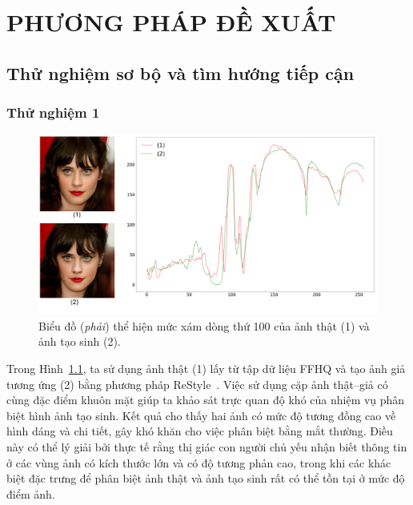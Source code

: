 \chapter{PHƯƠNG PHÁP ĐỀ XUẤT}
\label{Chapter3}
\section{Thử nghiệm sơ bộ và tìm hướng tiếp cận}
%
\subsection{Thử nghiệm 1}
%
\begin{figure}[h!]
	\centering
	\includegraphics[width=1.0\linewidth]{Images/restyle-encoder-1.png}
	\begin{minipage}{1.0\linewidth}
		\caption{Biểu đồ (\textit{phải}) thể hiện mức xám dòng thứ 100 của ảnh thật (1) và ảnh tạo sinh (2).}
		\label{fig:restyle-encoder-1}
	\end{minipage}
\end{figure}
%
Trong Hình~\ref{fig:restyle-encoder-1}, ta sử dụng ảnh thật (1) lấy từ tập dữ liệu FFHQ và tạo ảnh giả tương ứng (2) bằng phương pháp ReStyle~\cite{alaluf2021restyle}. 
%
Việc sử dụng cặp ảnh thật–giả có cùng đặc điểm khuôn mặt giúp ta khảo sát trực quan độ khó của nhiệm vụ phân biệt hình ảnh tạo sinh. Kết quả cho thấy hai ảnh có mức độ tương đồng cao về hình dáng và chi tiết, gây khó khăn cho việc phân biệt bằng mắt thường.
%
Điều này có thể lý giải bởi thực tế rằng thị giác con người chủ yếu nhận biết thông tin ở các vùng ảnh có kích thước lớn và có độ tương phản cao, trong khi các khác biệt đặc trưng để phân biệt ảnh thật và ảnh tạo sinh rất có thể tồn tại ở mức độ điểm ảnh.
%
%

